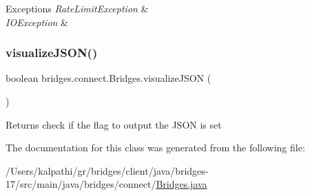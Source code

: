 \begin{DoxyExceptions}{Exceptions}
{\em Rate\+Limit\+Exception} & \\
\hline
{\em I\+O\+Exception} & \\
\hline
\end{DoxyExceptions}
\mbox{\label{classbridges_1_1connect_1_1_bridges_afd3c63780396e92c94c923037385b31d}} 
\subsubsection{\texorpdfstring{visualize\+J\+S\+O\+N()}{visualizeJSON()}}
{\footnotesize\ttfamily boolean bridges.\+connect.\+Bridges.\+visualize\+J\+S\+ON (\begin{DoxyParamCaption}{ }\end{DoxyParamCaption})}

\begin{DoxyReturn}{Returns}
check if the flag to output the J\+S\+ON is set 
\end{DoxyReturn}


The documentation for this class was generated from the following file\+:\begin{DoxyCompactItemize}
\item 
/\+Users/kalpathi/gr/bridges/client/java/bridges-\/17/src/main/java/bridges/connect/\mbox{\hyperlink{_bridges_8java}{Bridges.\+java}}\end{DoxyCompactItemize}
